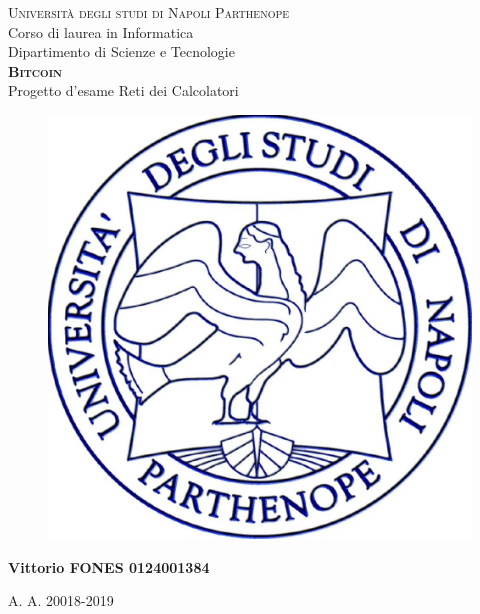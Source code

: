 \documentclass[a4paper,10pt]{report}
\begin{document}
  \thispagestyle{empty}
  \enlargethispage{60mm}
  \begin{center}
    \Large{\textsc{Università degli studi di Napoli Parthenope}}\\
    \large{Corso di laurea in Informatica}\\
    \large{Dipartimento di Scienze e Tecnologie}\\
    \vspace{25mm}
    \textbf{\Huge{\textsc{Bitcoin}}}\\
    \Large{Progetto d'esame Reti dei Calcolatori}\\
    \vspace{7mm}
    \begin{figure}[h]
    	\begin{center}
    	   \includegraphics[scale=0.2]{parthenope.jpeg}
      \end{center}
    \end{figure}
    \vspace{35mm}
    \textbf{Vittorio FONES 0124001384}
    \vspace{5mm}

    \large{A. A. 20018-2019}
  \end{center}



  \tableofcontents
  \listoffigures
\end{document}
